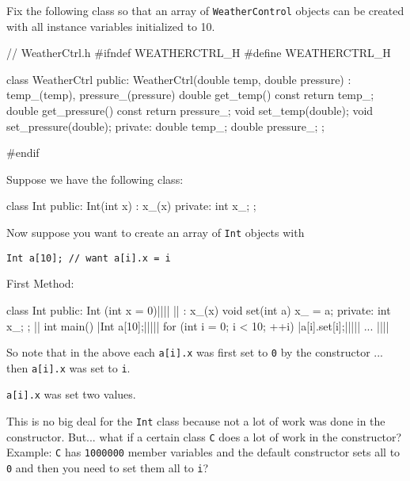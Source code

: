 \begin{ex}
Fix the following class so that an array of
\texttt{WeatherControl} objects can be created with all instance variables
initialized to 10.
\begin{console}
// WeatherCtrl.h
#ifndef WEATHERCTRL_H
#define WEATHERCTRL_H

class WeatherCtrl
{
public:
        WeatherCtrl(double temp, double pressure)
        : temp_(temp), pressure_(pressure)
        {}
        double get_temp() const { return temp_; }
        double get_pressure() const { return pressure_; }
        void set_temp(double);
        void set_pressure(double);
private:
        double temp_;
        double pressure_;
};

#endif
\end{console}
\end{ex}
Suppose we have the following class:

\begin{console}
class Int
{
public:
        Int(int x)
        : x_(x)
        {}
private:
        int x_;
};
\end{console}
Now suppose you want to create an array of \texttt{Int} objects with
\begin{center}
\texttt{Int a[10]; // want a[i].x = i}
\end{center}
First Method:
\begin{consolethree}[escapeinside=||]
class Int
{
public:
    Int (int x = 0)||||
    ||   
        : x_(x) {}
    void set(int a)
    {
        x_ = a;
    }
private:                    
    int x_;
};
||
int main()
{               
    |Int a[10];|||||
    for (int i = 0; i < 10; ++i)
        |a[i].set[i];|||||
    ... ||||
}
\end{consolethree}
\newpage So note that in the above each \texttt{a[i].x} was first set to \texttt{0} by the constructor ... then \texttt{a[i].x} was set to \texttt{i}.

 \texttt{a[i].x} was set two values.

This is no big deal for the \texttt{Int} class because not a lot of work
was done in the constructor. But... what if a certain class \texttt{C}
does a lot of work in the constructor? Example: \texttt{C} has
\texttt{1000000} member variables and the default constructor sets all to
\texttt{0} and then you need to set them all to \texttt{i}?

